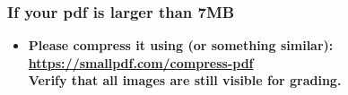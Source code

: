 \documentclass[../report.tex]{subfiles}
\begin{document}
    
    \begin{frame}[t]
        \frametitle{If your pdf is larger than 7MB}
        \begin{normalsize}
            \begin{itemize}
                \setlength\itemsep{1em}
                
                \item[] \textbf{Please compress it using (or something similar): \\
                    \selectfont\textcolor{blue}{\url{https://smallpdf.com/compress-pdf}} \\
                    Verify that all images are still visible for grading.
                }
                
            \end{itemize}
        \end{normalsize}
    \end{frame}
\end{document}
